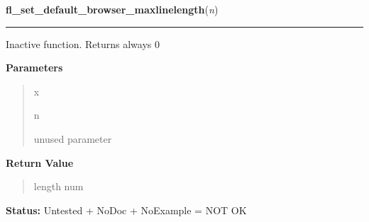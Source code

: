 \hspace{.8\funcindent}\begin{boxedminipage}{\funcwidth}

    \raggedright \textbf{fl\_set\_default\_browser\_maxlinelength}(\textit{n})

    \vspace{-1.5ex}

    \rule{\textwidth}{0.5\fboxrule}
\setlength{\parskip}{2ex}
    Inactive function. Returns always 0

\setlength{\parskip}{1ex}
      \textbf{Parameters}
      \vspace{-1ex}

      \begin{quote}
        \begin{Ventry}{x}

          \item[n]

          unused parameter

        \end{Ventry}

      \end{quote}

      \textbf{Return Value}
    \vspace{-1ex}

      \begin{quote}
      length num

      \end{quote}

\textbf{Status:} Untested + NoDoc + NoExample = NOT OK



    \end{boxedminipage}

    \label{xformslib:library:fl_set_browser_hscroll_callback}

    \vspace{0.5ex}

